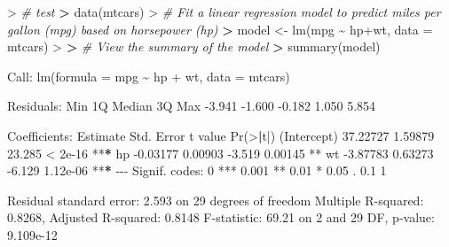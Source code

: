 \documentclass[
]{article}
\newenvironment{Shaded}{\begin{snugshade}}{\end{snugshade}}
\newcommand{\AttributeTok}[1]{\textcolor[rgb]{0.77,0.63,0.00}{#1}}
\newcommand{\CommentTok}[1]{\textcolor[rgb]{0.56,0.35,0.01}{\textit{#1}}}
\newcommand{\DecValTok}[1]{\textcolor[rgb]{0.00,0.00,0.81}{#1}}
\newcommand{\ErrorTok}[1]{\textcolor[rgb]{0.64,0.00,0.00}{\textbf{#1}}}
\newcommand{\FloatTok}[1]{\textcolor[rgb]{0.00,0.00,0.81}{#1}}
\newcommand{\FunctionTok}[1]{\textcolor[rgb]{0.00,0.00,0.00}{#1}}
\newcommand{\NormalTok}[1]{#1}
\newcommand{\OtherTok}[1]{\textcolor[rgb]{0.56,0.35,0.01}{#1}}
\newcommand{\SpecialCharTok}[1]{\textcolor[rgb]{0.00,0.00,0.00}{#1}}
\newcommand{\StringTok}[1]{\textcolor[rgb]{0.31,0.60,0.02}{#1}}
\begin{document}
\begin{Shaded}
\begin{Highlighting}[]
\SpecialCharTok{\textgreater{}} \CommentTok{\# test}
\ErrorTok{\textgreater{}} \FunctionTok{data}\NormalTok{(mtcars)}
\SpecialCharTok{\textgreater{}} \CommentTok{\# Fit a linear regression model to predict miles per gallon (mpg) based on horsepower (hp)}
\ErrorTok{\textgreater{}}\NormalTok{ model }\OtherTok{\textless{}{-}} \FunctionTok{lm}\NormalTok{(mpg }\SpecialCharTok{\textasciitilde{}}\NormalTok{ hp}\SpecialCharTok{+}\NormalTok{wt, }\AttributeTok{data =}\NormalTok{ mtcars)}
\SpecialCharTok{\textgreater{}} 
\ErrorTok{\textgreater{}} \CommentTok{\# View the summary of the model}
\ErrorTok{\textgreater{}} \FunctionTok{summary}\NormalTok{(model)}

\NormalTok{Call}\SpecialCharTok{:}
\FunctionTok{lm}\NormalTok{(}\AttributeTok{formula =}\NormalTok{ mpg }\SpecialCharTok{\textasciitilde{}}\NormalTok{ hp }\SpecialCharTok{+}\NormalTok{ wt, }\AttributeTok{data =}\NormalTok{ mtcars)}

\NormalTok{Residuals}\SpecialCharTok{:}
\NormalTok{   Min     1Q Median     3Q    Max }
\SpecialCharTok{{-}}\FloatTok{3.941} \SpecialCharTok{{-}}\FloatTok{1.600} \SpecialCharTok{{-}}\FloatTok{0.182}  \FloatTok{1.050}  \FloatTok{5.854} 

\NormalTok{Coefficients}\SpecialCharTok{:}
\NormalTok{            Estimate Std. Error t value }\FunctionTok{Pr}\NormalTok{(}\SpecialCharTok{\textgreater{}}\ErrorTok{|}\NormalTok{t}\SpecialCharTok{|}\NormalTok{)    }
\NormalTok{(Intercept) }\FloatTok{37.22727}    \FloatTok{1.59879}  \FloatTok{23.285}  \SpecialCharTok{\textless{}} \FloatTok{2e{-}16} \SpecialCharTok{**}\ErrorTok{*}
\NormalTok{hp          }\SpecialCharTok{{-}}\FloatTok{0.03177}    \FloatTok{0.00903}  \SpecialCharTok{{-}}\FloatTok{3.519}  \FloatTok{0.00145} \SpecialCharTok{**} 
\NormalTok{wt          }\SpecialCharTok{{-}}\FloatTok{3.87783}    \FloatTok{0.63273}  \SpecialCharTok{{-}}\FloatTok{6.129} \FloatTok{1.12e{-}06} \SpecialCharTok{**}\ErrorTok{*}
\SpecialCharTok{{-}{-}{-}}
\NormalTok{Signif. codes}\SpecialCharTok{:}  \DecValTok{0} \StringTok{\textquotesingle{}***\textquotesingle{}} \FloatTok{0.001} \StringTok{\textquotesingle{}**\textquotesingle{}} \FloatTok{0.01} \StringTok{\textquotesingle{}*\textquotesingle{}} \FloatTok{0.05} \StringTok{\textquotesingle{}.\textquotesingle{}} \FloatTok{0.1} \StringTok{\textquotesingle{} \textquotesingle{}} \DecValTok{1}

\NormalTok{Residual standard error}\SpecialCharTok{:} \FloatTok{2.593}\NormalTok{ on }\DecValTok{29}\NormalTok{ degrees of freedom}
\NormalTok{Multiple R}\SpecialCharTok{{-}}\NormalTok{squared}\SpecialCharTok{:}  \FloatTok{0.8268}\NormalTok{,    Adjusted R}\SpecialCharTok{{-}}\NormalTok{squared}\SpecialCharTok{:}  \FloatTok{0.8148} 
\NormalTok{F}\SpecialCharTok{{-}}\NormalTok{statistic}\SpecialCharTok{:} \FloatTok{69.21}\NormalTok{ on }\DecValTok{2}\NormalTok{ and }\DecValTok{29}\NormalTok{ DF,  p}\SpecialCharTok{{-}}\NormalTok{value}\SpecialCharTok{:} \FloatTok{9.109e{-}12}
\end{Highlighting}
\end{Shaded}
\end{document}
